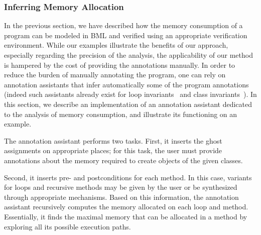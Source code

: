 

\subsubsection{Inferring Memory Allocation}\label{sec:infer}
In the previous section, we have described how the memory consumption
of a program can be modeled in BML and verified using an appropriate
verification environment. While our examples illustrate the benefits
of our approach, especially regarding the precision of the analysis,
the applicability of our method is hampered by the cost of providing
the annotations manually. In order to reduce the burden of manually
annotating the program, one can rely on annotation assistants that
infer automatically some of the program annotations (indeed such
assistants already exist for loop invariants~\cite{NimmerE02:ISSTA} and class
invariants~\cite{log04:vmcai}). In this section, we describe an
implementation of an annotation assistant dedicated to the analysis of
memory consumption, and illustrate its functioning on an example.
 
The annotation assistant performs two tasks. First, it inserts the
ghost assignments on appropriate places; for this task, the user must
provide annotations about the memory required to create objects of the
given classes. 

Second, it inserts pre- and postconditions for each method. In this case, variants for loops and recursive methods may be given by the user or be
synthesized through appropriate mechanisms.  Based on this
information, the annotation assistant recursively computes the memory
allocated on each loop and method. Essentially, it finds the maximal
memory that can be allocated in a method by exploring all its possible
execution paths.

